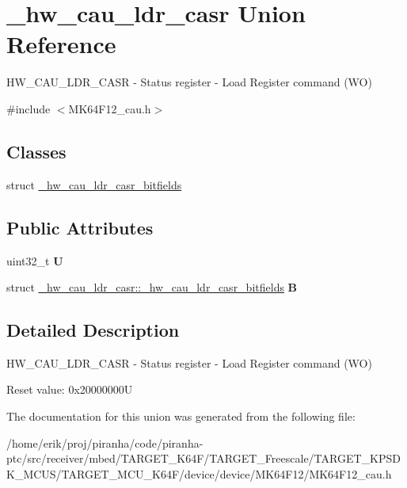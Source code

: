 \hypertarget{union__hw__cau__ldr__casr}{}\section{\+\_\+hw\+\_\+cau\+\_\+ldr\+\_\+casr Union Reference}
\label{union__hw__cau__ldr__casr}


H\+W\+\_\+\+C\+A\+U\+\_\+\+L\+D\+R\+\_\+\+C\+A\+SR -\/ Status register -\/ Load Register command (WO)  




{\ttfamily \#include $<$M\+K64\+F12\+\_\+cau.\+h$>$}

\subsection*{Classes}
\begin{DoxyCompactItemize}
\item 
struct \hyperlink{struct__hw__cau__ldr__casr_1_1__hw__cau__ldr__casr__bitfields}{\+\_\+hw\+\_\+cau\+\_\+ldr\+\_\+casr\+\_\+bitfields}
\end{DoxyCompactItemize}
\subsection*{Public Attributes}
\begin{DoxyCompactItemize}
\item 
uint32\+\_\+t {\bfseries U}\hypertarget{union__hw__cau__ldr__casr_a1805b669e72d29a3739c20aa51df74c7}{}\label{union__hw__cau__ldr__casr_a1805b669e72d29a3739c20aa51df74c7}

\item 
struct \hyperlink{struct__hw__cau__ldr__casr_1_1__hw__cau__ldr__casr__bitfields}{\+\_\+hw\+\_\+cau\+\_\+ldr\+\_\+casr\+::\+\_\+hw\+\_\+cau\+\_\+ldr\+\_\+casr\+\_\+bitfields} {\bfseries B}\hypertarget{union__hw__cau__ldr__casr_ad1b7fbacfe11f025d41a0beabb4db1a0}{}\label{union__hw__cau__ldr__casr_ad1b7fbacfe11f025d41a0beabb4db1a0}

\end{DoxyCompactItemize}


\subsection{Detailed Description}
H\+W\+\_\+\+C\+A\+U\+\_\+\+L\+D\+R\+\_\+\+C\+A\+SR -\/ Status register -\/ Load Register command (WO) 

Reset value\+: 0x20000000U 

The documentation for this union was generated from the following file\+:\begin{DoxyCompactItemize}
\item 
/home/erik/proj/piranha/code/piranha-\/ptc/src/receiver/mbed/\+T\+A\+R\+G\+E\+T\+\_\+\+K64\+F/\+T\+A\+R\+G\+E\+T\+\_\+\+Freescale/\+T\+A\+R\+G\+E\+T\+\_\+\+K\+P\+S\+D\+K\+\_\+\+M\+C\+U\+S/\+T\+A\+R\+G\+E\+T\+\_\+\+M\+C\+U\+\_\+\+K64\+F/device/device/\+M\+K64\+F12/M\+K64\+F12\+\_\+cau.\+h\end{DoxyCompactItemize}
